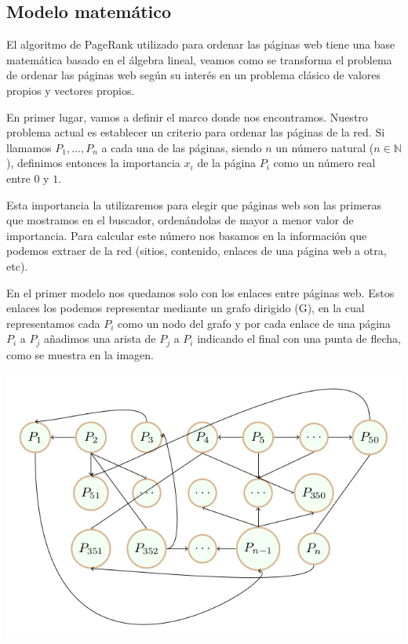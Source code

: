 \documentclass[size=a4, parskip=half, titlepage=false, toc=flat, toc=bib, 12pt]{scrartcl}
\theoremstyle{theorem-style}
\theoremstyle{definition-style}
\theoremstyle{remark-style}
\theoremstyle{example-style}
\theoremstyle{definition-style}
\theoremstyle{remark-style}
\begin{document}
\begin{itemize}
\end{itemize}

\subsection{Modelo matemático}

El algoritmo de PageRank utilizado para ordenar las páginas web tiene una base matemática basado en el álgebra lineal, veamos como se transforma el problema de ordenar las páginas web según su interés en un problema clásico de valores propios y vectores propios.

En primer lugar, vamos a definir el marco donde nos encontramos. Nuestro problema actual es establecer un criterio para ordenar las páginas de la red. Si llamamos $P_1, \dots, P_n$ a cada una de las páginas, siendo $n$ un número natural ($n \in \mathbb{N}$), definimos entonces la importancia $x_i$  de la página $P_i$ como un número real entre $0$ y $1$.

Esta importancia la utilizaremos para elegir que páginas web son las primeras que mostramos en el buscador, ordenándolas de mayor  a menor valor de importancia.
Para calcular este número nos basamos en la información que podemos extraer de la red (sitios, contenido, enlaces de una página web a otra, etc).

En el primer modelo nos quedamos solo con los enlaces entre páginas web. Estos enlaces los podemos representar mediante un grafo dirigido (G), en la cual representamos cada $P_i$ como un nodo del grafo y por cada enlace de una página $P_i$ a $P_j$ añadimos una arista de $P_j$ a $P_i$ indicando el final con una punta de flecha, como se muestra en la imagen.

\includegraphics[width=1.0\textwidth]{./img/grafoini}
\end{document}
